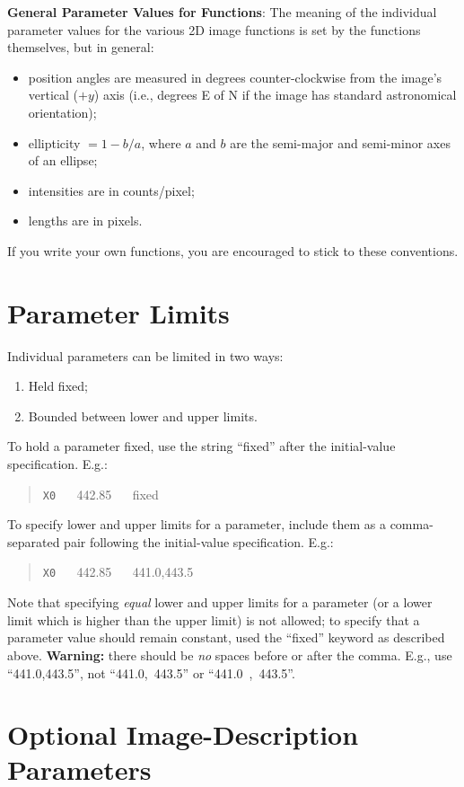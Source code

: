 \documentclass[10pt,a4paper,article]{memoir}
\begin{document}
\textbf{General Parameter Values for Functions}: The meaning of the individual
parameter values for the various 2D image functions is set by the functions
themselves, but in general: 
\begin{itemize}
\item position angles are measured in degrees counter-clockwise
from the image's vertical ($+y$) axis (i.e., degrees E of N if the image has standard
astronomical orientation);
\item ellipticity $= 1 - b/a$, where $a$ and $b$ are the
semi-major and semi-minor axes of an ellipse;
\item intensities are in counts/pixel;
\item lengths are in pixels. 
\end{itemize}
If you write your own functions, you are encouraged
to stick to these conventions.

\section{Parameter Limits}\label{sec:param-limits}

Individual parameters can be limited in two ways:
\begin{enumerate}
\item Held fixed;
\item Bounded between lower and upper limits.
\end{enumerate}
To hold a parameter fixed, use the string ``fixed'' after the initial-value
specification. E.g.:
\begin{quote}
\texttt{X0} ~~ 442.85 ~~ fixed
\end{quote}
To specify lower and upper limits for a parameter, include them as a comma-separated
pair following the initial-value specification. E.g.:
\begin{quote}
\texttt{X0} ~~ 442.85 ~~ 441.0,443.5
\end{quote}
Note that specifying \textit{equal} lower and upper limits for a parameter (or a lower limit
which is higher than the upper limit) is not allowed; to specify that a parameter
value should remain constant, used the ``fixed'' keyword as described above.
\textbf{Warning:} there should be \textit{no} spaces before or after the comma. E.g., use ``441.0,443.5'',
not ``441.0,~443.5'' or ``441.0~,~443.5''.


\section{Optional Image-Description Parameters}
\end{document}
